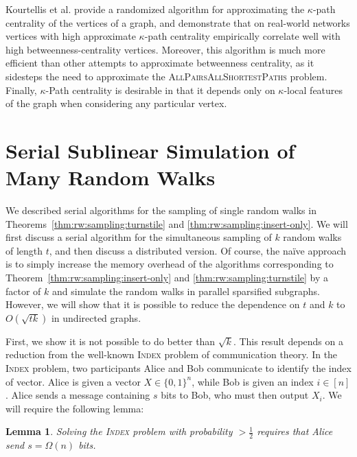 \documentclass{report}
\newtheorem{lemma}[theorem]{Lemma}
\newcommand{\algoname}[1]{\textnormal{\textsc{#1}}}
\begin{document}
Kourtellis et al. provide a randomized algorithm for approximating the $\kappa$-path centrality of the vertices of a graph, and demonstrate that on real-world networks vertices with high approximate $\kappa$-path centrality empirically correlate well with high betweenness-centrality vertices. 
Moreover, this algorithm is much more efficient than other attempts to approximate betweenness centrality, as it sidesteps the need to approximate the \algoname{AllPairsAllShortestPaths} problem.
Finally, $\kappa$-Path centrality is desirable in that it depends only on $\kappa$-local features of the graph when considering any particular vertex.




\section{Serial Sublinear Simulation of Many Random Walks}
 \label{walks:sec:walks}

We described serial algorithms for the sampling of single random walks in Theorems~\ref{thm:rw:sampling:turnstile} and \ref{thm:rw:sampling:insert-only}.
We will first discuss a serial algorithm for the simultaneous sampling of $k$ random walks of length $t$, and then discuss a distributed version. 
%
Of course, the na\"ive approach is to simply increase the memory overhead of the algorithms corresponding to Theorem~\ref{thm:rw:sampling:insert-only} and \ref{thm:rw:sampling:turnstile} by a factor of $k$ and simulate the random walks in parallel sparsified subgraphs.
However, we will show that it is possible to reduce the dependence on $t$ and $k$ to $O(\sqrt{tk})$ in undirected graphs.

First, we show it is not possible to do better than $\sqrt{k}$.
This result depends on a reduction from the well-known \algoname{Index} problem of communication theory.
In the \algoname{Index} problem, two participants Alice and Bob communicate to identify the index of vector.
Alice is given a vector $X \in \{0,1\}^n$, while Bob is given an index $i \in [n]$. 
Alice sends a message containing $s$ bits to Bob, who must then output $X_i$. 
We will require the following lemma:
\begin{lemma} \label{lem:index}
Solving the \algoname{Index} problem with probability $> \frac{1}{2}$ requires that Alice send $s = \Omega(n)$ bits.
\end{lemma}
\end{document}

